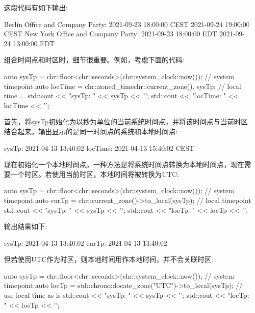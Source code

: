 这段代码有如下输出:

\begin{shell}
Berlin Office and Company Party:
  2021-09-23 18:00:00 CEST
  2021-09-24 19:00:00 CEST
New York Office and Company Party:
  2021-09-23 18:00:00 EDT
  2021-09-24 13:00:00 EDT
\end{shell}

组合时间点和时区时，细节很重要。例如，考虑下面的代码:

\begin{cpp}
auto sysTp = chr::floor<chr::seconds>(chr::system_clock::now()); // system timepoint
auto locTime = chr::zoned_time{chr::current_zone(), sysTp}; // local time
...
std::cout << "sysTp:         " << sysTp << '\n';
std::cout << "locTime:       " << locTime << '\n';
\end{cpp}

首先，将sysTp初始化为以秒为单位的当前系统时间点，并将该时间点与当前时区结合起来。输出显示的是同一时间点的系统和本地时间点:

\begin{shell}
sysTp:      2021-04-13 13:40:02
locTime:    2021-04-13 15:40:02 CEST
\end{shell}

现在初始化一个本地时间点。一种方法是将系统时间点转换为本地时间点，现在需要一个时区。若使用当前时区，本地时间将被转换为UTC:

\begin{cpp}
auto sysTp = chr::floor<chr::seconds>(chr::system_clock::now()); // system timepoint
auto curTp = chr::current_zone()->to_local(sysTp); // local timepoint
std::cout << "sysTp:            " << sysTp << '\n';
std::cout << "locTp:            " << locTp << '\n';
\end{cpp}

输出结果如下:

\begin{shell}
sysTp:     2021-04-13 13:40:02
curTp:     2021-04-13 13:40:02
\end{shell}

但若使用UTC作为时区，则本地时间用作本地时间，并不会关联时区:

\begin{cpp}
auto sysTp = chr::floor<chr::seconds>(chr::system_clock::now()); // system timepoint
auto locTp = std::chrono::locate_zone("UTC")->to_local(sysTp); // use local time as is
std::cout << "sysTp:              " << sysTp << '\n';
std::cout << "locTp:              " << locTp << '\n';
\end{cpp}


